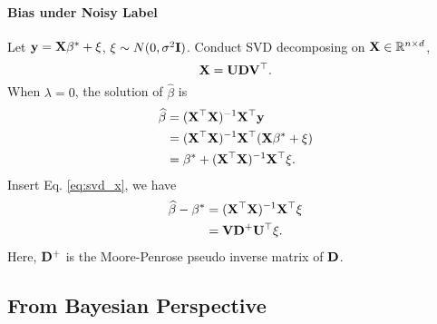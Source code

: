 \paragraph{Bias under Noisy Label}
Let $\mathbf{y} = \mathbf{X} \beta^* + \xi$, $\xi \sim N(0, \sigma^2 \mathbf{I})$. Conduct SVD decomposing on $\mathbf{X} \in \mathbb{R}^{n \times d}$,
\begin{equation}
	\mathbf{X} = \mathbf{U} \mathbf{D} \mathbf{V}^\top. \label{eq:svd_x}
\end{equation} 
When $\lambda=0$, the solution of $\widehat{\beta}$ is 
\begin{align}
	\widehat{\beta} & = (\mathbf{X} ^\top \mathbf{X} )^{-1} \mathbf{X}^\top \mathbf{y} \\
	& = (\mathbf{X} ^\top \mathbf{X} )^{-1} \mathbf{X}^\top (\mathbf{X} \beta^* + \xi) \\
	& = \beta^* + (\mathbf{X} ^\top \mathbf{X} )^{-1} \mathbf{X}^\top \xi.
\end{align}
Insert Eq. \ref{eq:svd_x}, we have 
\begin{align}
	\widehat{\beta} - \beta^* & =  (\mathbf{X} ^\top \mathbf{X} )^{-1} \mathbf{X}^\top \xi \\
	& = \mathbf{V} \mathbf{D} ^+ \mathbf{U}^\top \xi.
\end{align} 
Here, $ \mathbf{D} ^+ $ is the Moore-Penrose pseudo inverse matrix of $\mathbf{D}$.

\subsection{From Bayesian Perspective} 

